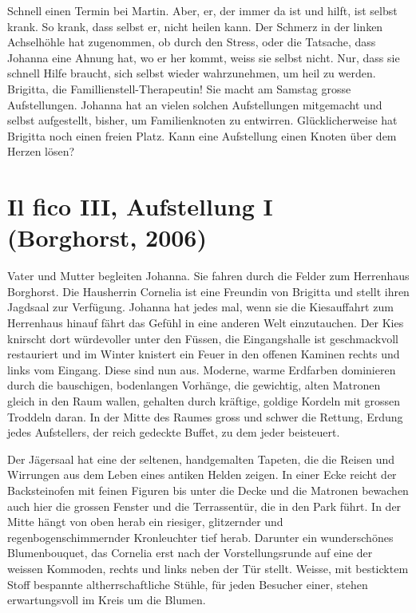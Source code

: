 \documentclass[10pt,titlepage,a5paper]{book}
\begin{document}
Schnell einen Termin bei Martin. Aber, er, der immer da ist und hilft, ist selbst krank. So krank, dass  selbst er, nicht heilen kann. Der Schmerz in der linken Achselhöhle hat zugenommen, ob durch den Stress, oder die Tatsache, dass Johanna eine Ahnung hat, wo er her kommt, weiss sie selbst nicht. Nur, dass sie schnell Hilfe braucht, sich selbst wieder wahrzunehmen, um heil zu werden. Brigitta, die Famillienstell-Therapeutin!  Sie macht am Samstag grosse Aufstellungen. Johanna hat an vielen solchen Aufstellungen mitgemacht und selbst aufgestellt, bisher, um Familienknoten zu entwirren. Glü\-ck\-licherweise hat Brigitta noch einen freien Platz.  Kann eine Aufstellung einen Knoten über dem Herzen lösen?



\section*{Il fico III, Aufstellung I (Borghorst, 2006)}



Vater und Mutter begleiten Johanna. Sie fahren durch die Felder zum Herrenhaus Borghorst. Die Hausherrin Cornelia ist eine Freundin von Brigitta und stellt ihren Jagdsaal zur Verfügung. Johanna hat jedes mal, wenn sie die Kiesauffahrt zum Herrenhaus hinauf fährt das Gefühl in eine anderen Welt einzutauchen. Der Kies knirscht dort würdevoller unter den Füssen, die Eingangshalle ist geschmackvoll restauriert und im Winter knistert ein Feuer in den offenen Kaminen rechts und links vom Eingang. Diese sind nun aus. Moderne, warme Erdfarben dominieren durch die bauschigen, bodenlangen Vorhänge, die gewichtig, alten Matronen gleich in den Raum wallen, gehalten durch kräftige, goldige Kordeln mit grossen Troddeln daran. In der Mitte des Raumes gross und schwer die Rettung, Erdung jedes Aufstellers, der reich gedeckte Buffet, zu dem jeder beisteuert.

Der Jägersaal hat eine der seltenen, handgemalten Tapeten, die die Reisen und Wirrungen aus dem Leben eines antiken Helden zeigen. In einer Ecke reicht der Backsteinofen mit feinen Figuren bis unter die Decke und die Matronen bewachen auch hier die grossen Fenster und die Terrassentür, die in den Park führt. In der Mitte hängt von oben herab ein riesiger, glitzernder und regenbogenschimmernder Kronleuchter tief herab. Darunter ein wunderschönes Blumenbouquet, das Cornelia erst nach der Vorstellungsrunde auf eine der weissen Kommoden, rechts und links neben der Tür stellt. Weisse, mit besticktem Stoff bespannte altherrschaftliche Stühle, für jeden Besucher einer, stehen erwartungsvoll im Kreis um die Blumen.
\end{document}
